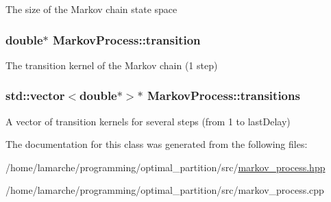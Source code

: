 The size of the Markov chain state space \hypertarget{classMarkovProcess_aae914f9e4fa973b5515bebc41508a289}{
\subsubsection[{transition}]{\setlength{\rightskip}{0pt plus 5cm}double$\ast$ Markov\-Process\-::transition}}\label{classMarkovProcess_aae914f9e4fa973b5515bebc41508a289}
The transition kernel of the Markov chain (1 step) \hypertarget{classMarkovProcess_a16e4250dba911530aff3d2766a367e5b}{
\subsubsection[{transitions}]{\setlength{\rightskip}{0pt plus 5cm}std\-::vector$<$double$\ast$$>$$\ast$ Markov\-Process\-::transitions}}\label{classMarkovProcess_a16e4250dba911530aff3d2766a367e5b}
A vector of transition kernels for several steps (from 1 to last\-Delay) 

The documentation for this class was generated from the following files\-:\begin{DoxyCompactItemize}
\item 
/home/lamarche/programming/optimal\-\_\-partition/src/\hyperlink{markov__process_8hpp}{markov\-\_\-process.\-hpp}\item 
/home/lamarche/programming/optimal\-\_\-partition/src/markov\-\_\-process.\-cpp\end{DoxyCompactItemize}
